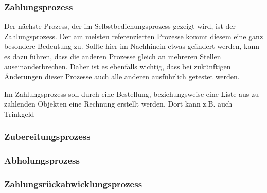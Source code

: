 \subsubsection{Zahlungsprozess}
Der nächste Prozess, der im Selbstbedienungsprozess gezeigt wird, ist der Zahlungsprozess. Der am meisten referenzierten Prozesse kommt diesem eine ganz besondere Bedeutung zu. Sollte hier im Nachhinein etwas geändert werden, kann es dazu führen, dass die anderen Prozesse gleich an mehreren Stellen auseinanderbrechen. Daher ist es ebenfalls wichtig, dass bei zukünftigen Änderungen dieser Prozesse auch alle anderen ausführlich getestet werden.

Im Zahlungsprozess soll durch eine Bestellung, beziehungsweise eine Liste aus zu zahlenden Objekten eine Rechnung erstellt werden. Dort kann z.B. auch Trinkgeld 

\clearpage
{}


\subsubsection{Zubereitungsprozess}
\clearpage
{}

\subsubsection{Abholungsprozess}
\clearpage
{}

\subsubsection{Zahlungsrückabwicklungsprozess}
\clearpage
{}


